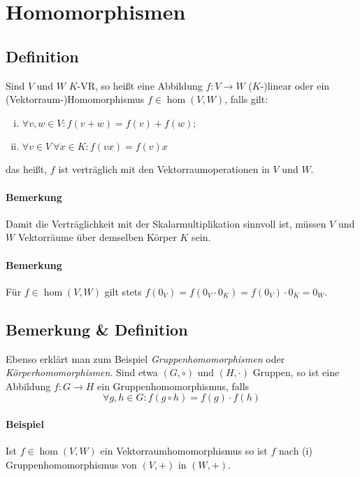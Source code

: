\section{Homomorphismen}
\subsection{Definition}
	\begin{Definition}[Homomorphismus]
		Sind $ V $ und $ W $ $ K $-VR, so heißt eine Abbildung $f: V \rightarrow W$ ($ K $-)linear oder ein (Vektorraum-)Homomorphismus $f\in \hom(V,W)$, falls gilt:
	

\begin{enumerate}[(i)]
	\item $\forall v,w \in V: f(v+w) = f(v) + f(w)$;
	\item $\forall v\in V\ \forall x\in K: f(vx) = f(v)x$
\end{enumerate}

    das heißt, $ f $ ist verträglich mit den Vektorraumoperationen in $ V $ und $ W $.
	\end{Definition}
\paragraph{Bemerkung}
	Damit die Verträglichkeit mit der Skalarmultiplikation sinnvoll ist, müssen $ V $ und $ W $ Vektorräume über demselben Körper $ K $ sein.

\paragraph{Bemerkung}
	Für $f\in \hom(V,W)$ gilt stets $f(0_V) = f(0_V\cdot0_K) = f(0_V)\cdot0_K = 0_W$.

\subsection{Bemerkung \& Definition}
        Ebenso erklärt man zum Beispiel \emph{Gruppenhomomorphismen} oder \emph{Körperhomomorphismen}. Sind etwa $(G,\circ)$ und $(H,\cdot)$ Gruppen, so ist eine Abbildung $f: G \to H$ ein Gruppenhomomorphismus, falls
        \begin{equation*}
            \forall g,h \in G: f(g\circ h) = f(g) \cdot f(h)
        \end{equation*}
  
\paragraph{Beispiel}
	Ist $f\in \hom(V,W)$ ein Vektorraumhomomorphismus so ist $ f $ nach (i) Gruppenhomomorphismus von $ (V,+) $ in $ (W,+) $.
  
